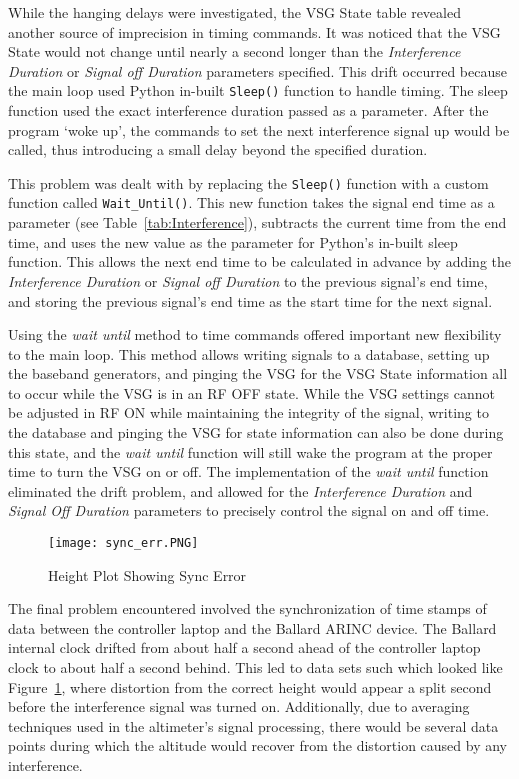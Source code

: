  While the hanging delays were investigated, the VSG State table revealed another source of imprecision in timing commands. It was noticed that the VSG State would not change until nearly a second longer than the \textit{Interference Duration} or \textit{Signal off Duration} parameters specified. This drift occurred because the main loop used Python in-built \texttt{Sleep()} function to handle timing. The sleep function used the exact interference duration passed as a parameter. After the program `woke up', the commands to set the next interference signal up would be called, thus introducing a small delay beyond the specified duration. 
 
 This problem was dealt with by replacing the \texttt{Sleep()} function with a custom function called \texttt{Wait\_Until()}. This new function takes the signal end time as a parameter (see Table~\ref{tab:Interference}), subtracts the current time from the end time, and uses the new value as the parameter for Python's in-built sleep function. This allows the next end time to be calculated in advance by adding the \textit{Interference Duration} or \textit{Signal off Duration} to the previous signal's end time, and storing the previous signal's end time as the start time for the next signal. %

Using the \textit{wait until} method to time commands offered important new flexibility to the main loop. This method allows writing signals to a database, setting up the baseband generators, and pinging the VSG for the VSG State information all to occur while the VSG is in an RF OFF state. While the VSG settings cannot be adjusted in RF ON while maintaining the integrity of the signal, writing to the database and pinging the VSG for state information can also be done during this state, and the \textit{wait until} function will still wake the program at the proper time to turn the VSG on or off. The implementation of the \textit{wait until} function eliminated the drift problem, and allowed for the \textit{Interference Duration} and \textit{Signal Off Duration} parameters to precisely control the signal on and off time. 

\begin{figure}[ht]
\centering
\texttt{[image: sync\_err.PNG]}
\caption{Height Plot Showing Sync Error}

\label{fig:sync}

\end{figure}
The final problem encountered involved the synchronization of time stamps of data between the controller laptop and the Ballard ARINC device. The Ballard internal clock drifted from about half a second ahead of the controller laptop clock to about half a second behind. This led to data sets such which looked like Figure~\ref{fig:sync}, where distortion from the correct height would appear a split second before the interference signal was turned on. Additionally, due to averaging techniques used in the altimeter's signal processing, there would be several data points during which the altitude would recover from the distortion caused by any interference. 


